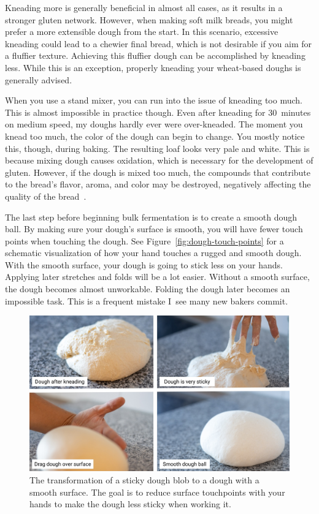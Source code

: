 Kneading more is generally beneficial in almost all cases, as it results in a
stronger gluten network. However, when making soft milk breads, you might prefer
a more extensible dough from the start. In this scenario, excessive kneading
could lead to a chewier final bread, which is not desirable if you aim for a
fluffier texture. Achieving this fluffier dough can be accomplished by kneading
less. While this is an exception, properly kneading your wheat-based doughs
is generally advised.

When you use a stand mixer, you can run into the issue of kneading too much. This
is almost impossible in practice though. Even after kneading for 30~minutes on medium
speed, my doughs hardly ever were over-kneaded. The moment you knead
too much, the color of the dough can begin to change. You mostly
notice this, though, during baking. The resulting loaf looks very
pale and white. This is because mixing dough causes oxidation,
which is necessary for the development of gluten.
However, if the dough is mixed too much, the compounds that contribute
to the bread's flavor, aroma, and color may be destroyed, negatively
affecting the quality of the bread~\cite{oxidization+dough}.

The last step before beginning bulk fermentation is to
create a smooth dough ball. By making sure your dough's surface is
smooth, you will have fewer touch points when touching the dough.
See Figure~\ref{fig:dough-touch-points} for a schematic visualization
of how your hand touches a rugged and smooth dough.
With the smooth surface, your dough is going to stick less on your hands. Applying
later stretches and folds will be a lot easier. Without a smooth
surface, the dough becomes almost unworkable. Folding the dough later
becomes an impossible task. This is a frequent mistake I~see many
new bakers commit.

\begin{figure}[!htb]
  \centering
  \includegraphics[width=\textwidth]{dough-ball-steps}
  \caption[Creating a smooth surface]{The transformation of a sticky dough
      blob to a dough with a smooth surface. The goal is to reduce surface
      touchpoints with your hands to make the dough less sticky when working
      it.}%
  \label{fig:dough-ball-steps}
\end{figure}

